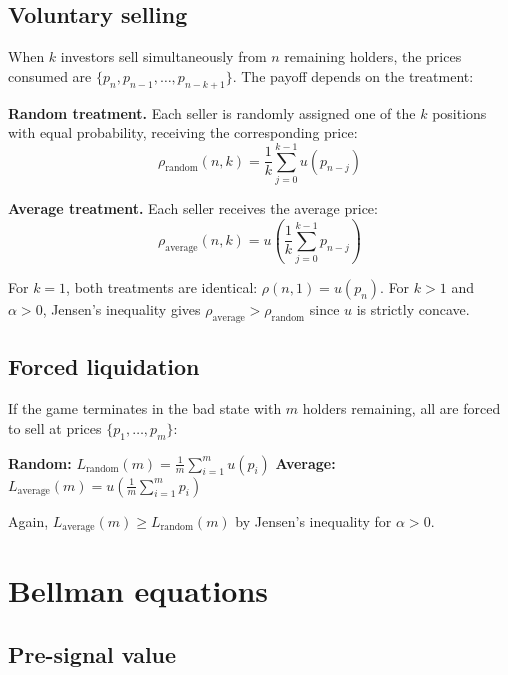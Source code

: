 \documentclass[11pt]{article}
\begin{document}
\subsection{Voluntary selling}

When $k$ investors sell simultaneously from $n$ remaining holders, the prices
consumed are $\{p_n, p_{n-1}, \ldots, p_{n-k+1}\}$. The payoff depends on the
treatment:

\textbf{Random treatment.} Each seller is randomly assigned one of the $k$
positions with equal probability, receiving the corresponding price:
\begin{equation}
    \rho_{\text{random}}(n, k)
    = \frac{1}{k} \sum_{j=0}^{k-1} u(p_{n-j})
    \label{eq:rho_random}
\end{equation}

\textbf{Average treatment.} Each seller receives the average price:
\begin{equation}
    \rho_{\text{average}}(n, k)
    = u\!\left(\frac{1}{k} \sum_{j=0}^{k-1} p_{n-j}\right)
    \label{eq:rho_average}
\end{equation}

For $k = 1$, both treatments are identical: $\rho(n, 1) = u(p_n)$. For $k > 1$
and $\alpha > 0$, Jensen's inequality gives
$\rho_{\text{average}} > \rho_{\text{random}}$ since $u$ is strictly concave.

\subsection{Forced liquidation}

If the game terminates in the bad state with $m$ holders remaining, all are
forced to sell at prices $\{p_1, \ldots, p_m\}$:

\textbf{Random:} $\displaystyle
L_{\text{random}}(m) = \frac{1}{m} \sum_{i=1}^{m} u(p_i)$
\qquad
\textbf{Average:} $\displaystyle
L_{\text{average}}(m) = u\!\left(\frac{1}{m} \sum_{i=1}^{m} p_i\right)$

Again, $L_{\text{average}}(m) \geq L_{\text{random}}(m)$ by Jensen's
inequality for $\alpha > 0$.

\section{Bellman equations}

\subsection{Pre-signal value}
\end{document}
